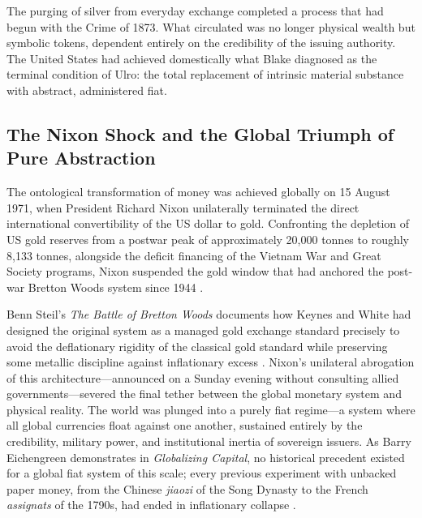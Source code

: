 \documentclass[
]{article}
\begin{document}
The purging of silver from everyday exchange completed a process that
had begun with the Crime of 1873. What circulated was no longer physical
wealth but symbolic tokens, dependent entirely on the credibility of the
issuing authority. The United States had achieved domestically what
Blake diagnosed as the terminal condition of Ulro: the total replacement
of intrinsic material substance with abstract, administered fiat.

\subsection{The Nixon Shock and the Global Triumph of Pure
Abstraction}\label{the-nixon-shock-and-the-global-triumph-of-pure-abstraction}

The ontological transformation of money was achieved globally on 15
August 1971, when President Richard Nixon unilaterally terminated the
direct international convertibility of the US dollar to gold.
Confronting the depletion of US gold reserves from a postwar peak of
approximately 20,000 tonnes to roughly 8,133 tonnes, alongside the
deficit financing of the Vietnam War and Great Society programs, Nixon
suspended the gold window that had anchored the post-war Bretton Woods
system since 1944 \citep{steil2013battle, eichengreen2019globalizing}.

Benn Steil's \emph{The Battle of Bretton Woods} documents how Keynes and
White had designed the original system as a managed gold exchange
standard precisely to avoid the deflationary rigidity of the classical
gold standard while preserving some metallic discipline against
inflationary excess \citep{steil2013battle}. Nixon's unilateral
abrogation of this architecture---announced on a Sunday evening without
consulting allied governments---severed the final tether between the
global monetary system and physical reality. The world was plunged into
a purely fiat regime---a system where all global currencies float
against one another, sustained entirely by the credibility, military
power, and institutional inertia of sovereign issuers. As Barry
Eichengreen demonstrates in \emph{Globalizing Capital}, no historical
precedent existed for a global fiat system of this scale; every previous
experiment with unbacked paper money, from the Chinese \emph{jiaozi} of
the Song Dynasty to the French \emph{assignats} of the 1790s, had ended
in inflationary collapse \citep{eichengreen2019globalizing}.
\end{document}
